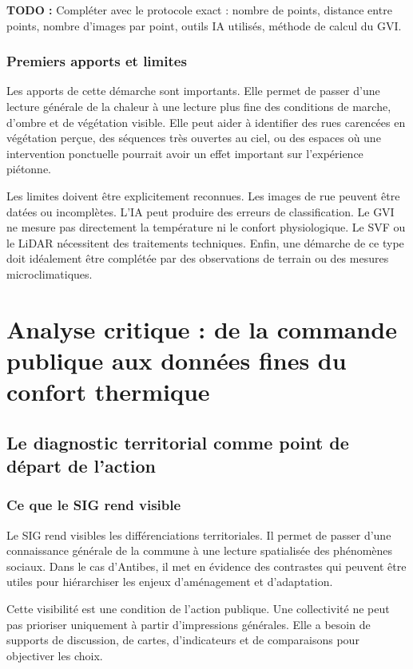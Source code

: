 \documentclass[11pt,a4paper]{report}
\newcommand{\todo}[1]{\textcolor{todored}{\textbf{TODO :} #1}}
\begin{document}
\todo{Compléter avec le protocole exact : nombre de points, distance entre points, nombre d'images par point, outils IA utilisés, méthode de calcul du GVI.}

\subsection{Premiers apports et limites}

Les apports de cette démarche sont importants. Elle permet de passer d'une lecture générale de la chaleur à une lecture plus fine des conditions de marche, d'ombre et de végétation visible. Elle peut aider à identifier des rues carencées en végétation perçue, des séquences très ouvertes au ciel, ou des espaces où une intervention ponctuelle pourrait avoir un effet important sur l'expérience piétonne.

Les limites doivent être explicitement reconnues. Les images de rue peuvent être datées ou incomplètes. L'IA peut produire des erreurs de classification. Le GVI ne mesure pas directement la température ni le confort physiologique. Le SVF ou le LiDAR nécessitent des traitements techniques. Enfin, une démarche de ce type doit idéalement être complétée par des observations de terrain ou des mesures microclimatiques.

\chapter{Analyse critique : de la commande publique aux données fines du confort thermique}

\section{Le diagnostic territorial comme point de départ de l'action}

\subsection{Ce que le SIG rend visible}

Le SIG rend visibles les différenciations territoriales. Il permet de passer d'une connaissance générale de la commune à une lecture spatialisée des phénomènes sociaux. Dans le cas d'Antibes, il met en évidence des contrastes qui peuvent être utiles pour hiérarchiser les enjeux d'aménagement et d'adaptation.

Cette visibilité est une condition de l'action publique. Une collectivité ne peut pas prioriser uniquement à partir d'impressions générales. Elle a besoin de supports de discussion, de cartes, d'indicateurs et de comparaisons pour objectiver les choix.
\end{document}
